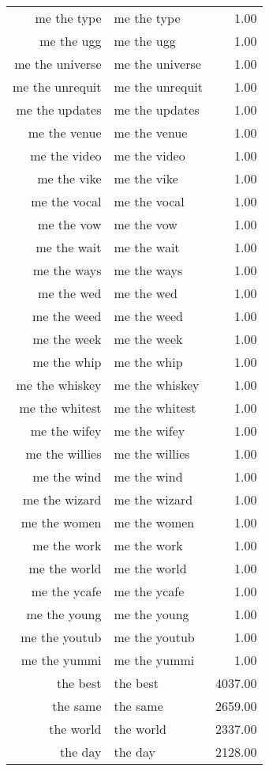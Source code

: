 \begin{table}[ht]
\begin{tabular}{rlr}
  me the type & me the type & 1.00 \\ 
  me the ugg & me the ugg & 1.00 \\ 
  me the universe & me the universe & 1.00 \\ 
  me the unrequit & me the unrequit & 1.00 \\ 
  me the updates & me the updates & 1.00 \\ 
  me the venue & me the venue & 1.00 \\ 
  me the video & me the video & 1.00 \\ 
  me the vike & me the vike & 1.00 \\ 
  me the vocal & me the vocal & 1.00 \\ 
  me the vow & me the vow & 1.00 \\ 
  me the wait & me the wait & 1.00 \\ 
  me the ways & me the ways & 1.00 \\ 
  me the wed & me the wed & 1.00 \\ 
  me the weed & me the weed & 1.00 \\ 
  me the week & me the week & 1.00 \\ 
  me the whip & me the whip & 1.00 \\ 
  me the whiskey & me the whiskey & 1.00 \\ 
  me the whitest & me the whitest & 1.00 \\ 
  me the wifey & me the wifey & 1.00 \\ 
  me the willies & me the willies & 1.00 \\ 
  me the wind & me the wind & 1.00 \\ 
  me the wizard & me the wizard & 1.00 \\ 
  me the women & me the women & 1.00 \\ 
  me the work & me the work & 1.00 \\ 
  me the world & me the world & 1.00 \\ 
  me the ycafe & me the ycafe & 1.00 \\ 
  me the young & me the young & 1.00 \\ 
  me the youtub & me the youtub & 1.00 \\ 
  me the yummi & me the yummi & 1.00 \\ 
  the best & the best & 4037.00 \\ 
  the same & the same & 2659.00 \\ 
  the world & the world & 2337.00 \\ 
  the day & the day & 2128.00 \\ 

\end{tabular}
\end{table}
